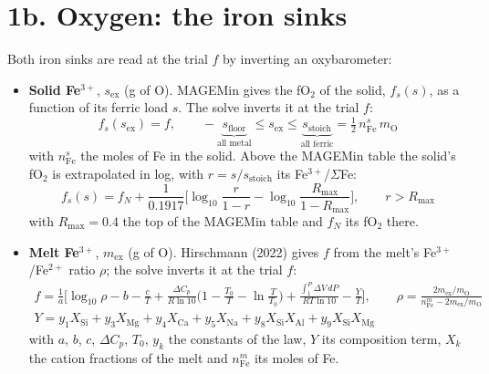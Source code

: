 \documentclass[11pt]{article}
\newcommand{\mO}{m_{\mathrm{O}}}
\begin{document}
\vspace*{\fill}
\clearpage
\section*{1b. Oxygen: the iron sinks}
\vspace*{\fill}
{\small\setlength{\abovedisplayskip}{13pt}\setlength{\belowdisplayskip}{13pt}\setlength{\abovedisplayshortskip}{13pt}\setlength{\belowdisplayshortskip}{13pt}
Both iron sinks are read at the trial $f$ by inverting an oxybarometer:
\begin{itemize}[leftmargin=1.2em,itemsep=5pt,topsep=5pt]
  \item \textbf{Solid Fe$^{3+}$}, $s_{\mathrm{ex}}$ (g of O). MAGEMin gives the fO$_2$ of the solid, $f_s(s)$, as a function of its ferric load $s$. The solve inverts it at the trial $f$:
  \[ f_s(s_{\mathrm{ex}})=f,\qquad -\underbrace{s_{\mathrm{floor}}}_{\text{all metal}}\le s_{\mathrm{ex}}\le \underbrace{s_{\mathrm{stoich}}}_{\text{all ferric}}=\tfrac12\,n_{\mathrm{Fe}}^{s}\,\mO \]
  with $n_{\mathrm{Fe}}^{s}$ the moles of Fe in the solid. Above the MAGEMin table the solid's fO$_2$ is extrapolated in log, with $r=s/s_{\mathrm{stoich}}$ its Fe$^{3+}$/$\Sigma$Fe:
  \[ f_s(s)=f_N+\frac{1}{0.1917}\Big[\log_{10}\frac{r}{1-r}-\log_{10}\frac{R_{\max}}{1-R_{\max}}\Big],\qquad r>R_{\max} \]
  with $R_{\max}=0.4$ the top of the MAGEMin table and $f_N$ its fO$_2$ there.
  \vspace{1.4cm}
  \item \textbf{Melt Fe$^{3+}$}, $m_{\mathrm{ex}}$ (g of O). Hirschmann (2022) gives $f$ from the melt's Fe$^{3+}$/Fe$^{2+}$ ratio $\rho$; the solve inverts it at the trial $f$:
  \begin{gather*}
    f=\frac{1}{a}\Big[\log_{10}\rho-b-\frac{c}{T}+\frac{\Delta C_p}{R\ln10}\Big(1-\frac{T_0}{T}-\ln\frac{T}{T_0}\Big)+\frac{\int_1^P\!\Delta V\,dP}{RT\ln10}-\frac{Y}{T}\Big],\qquad
    \rho=\frac{2m_{\mathrm{ex}}/\mO}{n_{\mathrm{Fe}}^{m}-2m_{\mathrm{ex}}/\mO}\\[20pt]
    Y=y_1X_{\mathrm{Si}}+y_3X_{\mathrm{Mg}}+y_4X_{\mathrm{Ca}}+y_5X_{\mathrm{Na}}+y_8X_{\mathrm{Si}}X_{\mathrm{Al}}+y_9X_{\mathrm{Si}}X_{\mathrm{Mg}}
  \end{gather*}
  with $a$, $b$, $c$, $\Delta C_p$, $T_0$, $y_k$ the constants of the law, $Y$ its composition term, $X_k$ the cation fractions of the melt and $n_{\mathrm{Fe}}^{m}$ its moles of Fe.
\end{itemize}
}

\vspace*{\fill}
\clearpage
\end{document}
